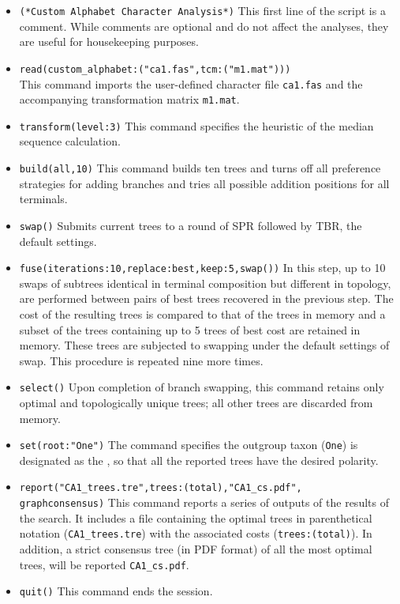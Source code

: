 \begin{itemize}
\item \texttt{(*Custom Alphabet Character Analysis*)} This first
line of the script is a comment. While comments are optional and
do not affect the analyses, they are useful for housekeeping purposes.
\item \texttt{read(custom\_alphabet:("ca1.fas",tcm:("m1.mat")))}\\ 
This command imports the user-defined 
character file \texttt{ca1.fas} and the accompanying transformation
matrix \texttt{m1.mat}.  
\item \texttt{transform(level:3)} This command specifies the 
heuristic  of the median sequence calculation.  
\item \texttt{build(all,10)} This command builds ten trees and 
turns off all preference strategies for adding branches and tries 
all possible addition positions for all terminals.
\item \texttt{swap()} Submits current trees to a round of SPR
followed by TBR, the default settings.  
\item \texttt{fuse(iterations:10,replace:best,keep:5,swap())} In this
step, up to 10 swaps of subtrees identical in terminal composition
but different in topology, are performed between pairs of best trees
recovered in the previous step. The cost of the resulting trees is
compared to that of the trees in memory and a subset of the trees
containing up to 5 trees of best cost are retained in memory. These
trees are subjected to swapping under the default settings of swap.
This procedure is repeated nine more times. 
\item \texttt{select()} Upon completion of branch swapping, this 
command retains only optimal and topologically unique trees; 
all other trees are discarded from memory.  
\item \texttt{set(root:"One")} The  command
specifies the outgroup taxon (\texttt{One}) is designated as the
, so that all the reported trees have the desired
polarity.  
\item \texttt{report("CA1\_trees.tre",trees:(total),"CA1\_cs.pdf", \\
graphconsensus)} This command reports a series of outputs of the
results of the search.  It includes a file containing the 
optimal trees in parenthetical notation (\texttt{CA1\_trees.tre})
with the associated costs (\texttt{trees:(total)}).  In addition,
a strict consensus tree (in PDF format) of all the most optimal
trees, will be reported \texttt{CA1\_cs.pdf}.  
\item \texttt{quit()} This command ends the \poy session.
\end{itemize}

